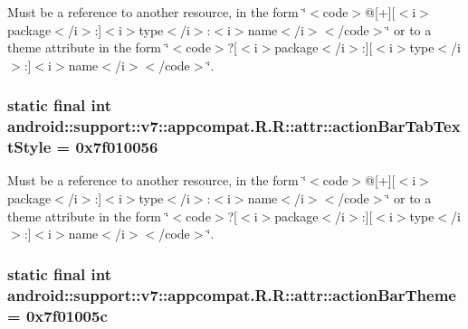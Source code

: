 Must be a reference to another resource, in the form \char`\"{}$<$code$>$@\mbox{[}+\mbox{]}\mbox{[}$<$i$>$package$<$/i$>$:\mbox{]}$<$i$>$type$<$/i$>$:$<$i$>$name$<$/i$>$$<$/code$>$\char`\"{} or to a theme attribute in the form \char`\"{}$<$code$>$?\mbox{[}$<$i$>$package$<$/i$>$:\mbox{]}\mbox{[}$<$i$>$type$<$/i$>$:\mbox{]}$<$i$>$name$<$/i$>$$<$/code$>$\char`\"{}. \hypertarget{classandroid_1_1support_1_1v7_1_1appcompat_1_1_r_1_1attr_e7a9b18ca9c33888d942115a05faf1d9}{
\subsubsection[{actionBarTabTextStyle}]{\setlength{\rightskip}{0pt plus 5cm}static final int android::support::v7::appcompat.R.R::attr::actionBarTabTextStyle = 0x7f010056}}
\label{classandroid_1_1support_1_1v7_1_1appcompat_1_1_r_1_1attr_e7a9b18ca9c33888d942115a05faf1d9}


Must be a reference to another resource, in the form \char`\"{}$<$code$>$@\mbox{[}+\mbox{]}\mbox{[}$<$i$>$package$<$/i$>$:\mbox{]}$<$i$>$type$<$/i$>$:$<$i$>$name$<$/i$>$$<$/code$>$\char`\"{} or to a theme attribute in the form \char`\"{}$<$code$>$?\mbox{[}$<$i$>$package$<$/i$>$:\mbox{]}\mbox{[}$<$i$>$type$<$/i$>$:\mbox{]}$<$i$>$name$<$/i$>$$<$/code$>$\char`\"{}. \hypertarget{classandroid_1_1support_1_1v7_1_1appcompat_1_1_r_1_1attr_f328426fd71f9d7d2ce8c0e00f24bade}{
\subsubsection[{actionBarTheme}]{\setlength{\rightskip}{0pt plus 5cm}static final int android::support::v7::appcompat.R.R::attr::actionBarTheme = 0x7f01005c}}
\label{classandroid_1_1support_1_1v7_1_1appcompat_1_1_r_1_1attr_f328426fd71f9d7d2ce8c0e00f24bade}


